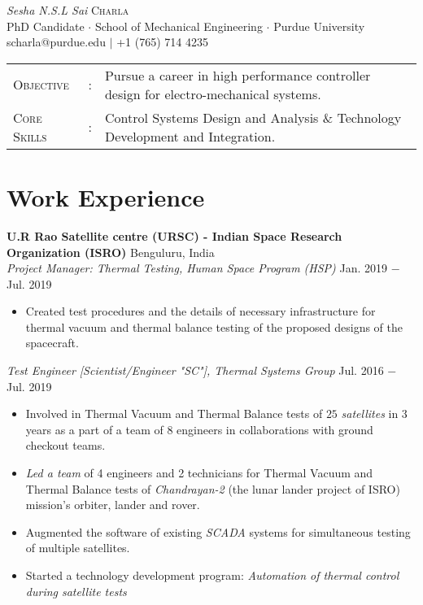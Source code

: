 \documentclass[letterpaper,10pt]{article}
\begin{document}
\begin{center}
\thispagestyle{empty}
\huge{\textit{Sesha N.S.L Sai} \textsc{Charla}}\\
\small PhD Candidate $\cdot$ School of Mechanical Engineering $\cdot$ Purdue University\\
\small scharla@purdue.edu $\mid$ +1 (765) 714 4235   \\
\end{center}



\begin{tabular}{l c l}
    {\large{\textsc{Objective}}}&:& Pursue a career in high performance controller design for electro-mechanical systems.\\
	{\large{\textsc{Core Skills}}}&:& Control Systems Design and Analysis \& Technology Development and Integration. %
\end{tabular}


\section{Work Experience}
\noindent \textbf{U.R Rao Satellite centre (URSC) - Indian Space Research Organization (ISRO)} \hfill Benguluru, India \\
\textit{Project Manager: Thermal Testing, Human Space Program (HSP)} \hfill Jan. 2019 $-$ Jul. 2019
\begin{itemize}[noitemsep,nolistsep,leftmargin=0.25in,label={--}]
    \item Created test procedures and the details of necessary infrastructure for thermal vacuum and thermal balance testing of the proposed designs of the spacecraft.
\end{itemize}

\vspace{3pt}
\textit{Test Engineer [Scientist/Engineer "SC"], Thermal Systems Group} \hfill Jul. 2016 $-$ Jul. 2019
\begin{itemize}[noitemsep,nolistsep,leftmargin=0.25in,label={--}]
    \item Involved in Thermal Vacuum and Thermal Balance tests of $25$ \textit{satellites} in 3 years as a part of a team of 8 engineers in collaborations with ground checkout teams.
	\item \textit{Led a team} of 4 engineers and 2 technicians for Thermal Vacuum and Thermal Balance tests of \textit{Chandrayan-2} (the lunar lander project of ISRO) mission's orbiter, lander and rover.
    \item Augmented the software of existing \textit{SCADA} systems for simultaneous testing of multiple satellites.
	\item Started a technology development program: \textit{Automation of thermal control during satellite tests}
\end{itemize}
\end{document}
